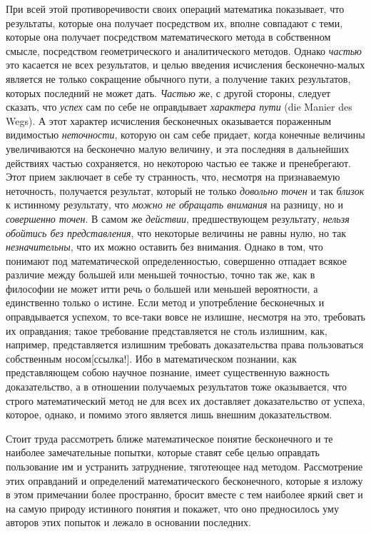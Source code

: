{При всей этой противоречивости своих операций математика показывает, что
результаты, которые она получает посредством их, вполне совпадают с теми,
которые она получает посредством математического метода в собственном
смысле, посредством геометрического и аналитического методов. Однако
{\em частью} это касается не всех результатов, и целью
введения исчисления бесконечно-малых является не только сокращение обычного
пути, а получение таких результатов, которых последний не может дать.
{\em Частью} же, с другой стороны, следует сказать, что
{\em успех} сам по себе не оправдывает
{\em характера пути} (die Manier des Wegs). А этот
характер исчисления бесконечных оказывается пораженным видимостью
{\em неточности}, которую он сам себе придает, когда
конечные величины увеличиваются на бесконечно малую величину, и эта
последняя в дальнейших действиях частью сохраняется, но некоторою частью ее
также и пренебрегают. Этот прием заключает в себе ту странность, что,
несмотря на признаваемую неточность, получается результат, который не
только {\em довольно точен} и так
{\em близок} к истинному результату, что
{\em можно не обращать внимания} на разницу, но и
{\em совершенно точен}. В самом же
{\em действии}, предшествующем результату,
{\em нельзя обойтись без представления}, что некоторые
величины не равны нулю, но так {\em незначительны}, что
их можно оставить без внимания. Однако в том, что понимают под
математической определенностью, совершенно отпадает всякое различие между
большей или меньшей точностью, точно так же, как в философии не может итти
речь о большей или меньшей вероятности, а единственно только о истине. Если
метод и употребление бесконечных и оправдывается успехом, то все-таки вовсе
не излишне, несмотря на это, требовать их оправдания; такое требование
представляется не столь излишним, как, например, представляется излишним
требовать доказательства права пользоваться собственным
носом[ссылка!]. Ибо в математическом познании,
как представляющем собою научное познание, имеет существенную важность
доказательство, а в отношении получаемых результатов тоже оказывается, что
строго математический метод не для всех их доставляет доказательство от
успеха, которое, однако, и помимо этого является лишь внешним
доказательством.

Стоит труда рассмотреть ближе математическое понятие бесконечного и те
наиболее замечательные попытки, которые ставят себе целью оправдать
пользование им и устранить затруднение, тяготеющее над методом.
Рассмотрение этих оправданий и определений математического бесконечного,
которые я изложу в этом примечании более пространно, бросит вместе с тем
наиболее яркий свет и на самую природу истинного понятия и покажет, что оно
предносилось уму авторов этих попыток и лежало в основании последних.

}
